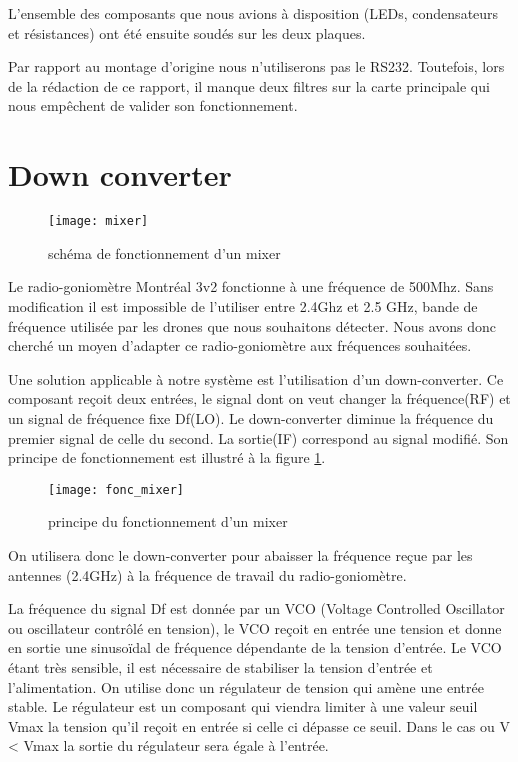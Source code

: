L'ensemble des composants que nous avions à disposition (LEDs, condensateurs et résistances) ont été ensuite soudés sur les deux plaques. 

Par rapport au montage d'origine nous n'utiliserons pas le RS232. Toutefois, lors de la rédaction de ce rapport, il manque deux filtres sur la carte principale qui nous empêchent de valider son fonctionnement.


\section{Down converter}


\begin{wrapfigure}{r}{0.4\textwidth}
  
  \texttt{[image: mixer]}
  \caption{schéma de fonctionnement d'un mixer}
\end{wrapfigure}


Le radio-goniomètre Montréal 3v2 fonctionne à une fréquence de 500Mhz. Sans modification il est impossible de l’utiliser entre 2.4Ghz et 2.5 GHz, bande de fréquence utilisée par les drones que nous souhaitons détecter. Nous avons donc cherché un moyen d’adapter ce radio-goniomètre aux fréquences souhaitées.

Une solution applicable à notre système est l'utilisation d'un down-converter. Ce composant reçoit deux entrées, le signal dont on veut changer la fréquence(RF) et un signal de fréquence fixe Df(LO). Le down-converter diminue la fréquence du premier signal de celle du second. La sortie(IF) correspond au signal modifié. Son principe de fonctionnement est illustré à la figure \ref{fig:mix}.



\begin{figure}[h]
  \centering
  \texttt{[image: fonc\_mixer]}
  \caption{principe du fonctionnement d'un mixer}
  \label{fig:mix}
\end{figure}

On utilisera donc le down-converter pour abaisser la fréquence reçue par les antennes (2.4GHz) à la fréquence de travail du radio-goniomètre.

La fréquence du signal Df est donnée par un VCO (Voltage Controlled Oscillator ou oscillateur contrôlé en tension), le VCO reçoit en entrée une tension et donne en sortie une sinusoïdal de fréquence dépendante de la tension d’entrée. Le VCO étant très sensible, il est nécessaire de stabiliser la tension d’entrée et l’alimentation. On utilise donc un régulateur de tension qui amène une entrée stable. Le régulateur est un composant qui viendra limiter à une valeur seuil Vmax la tension qu'il reçoit en entrée si celle ci dépasse ce seuil. Dans le cas ou V < Vmax la sortie du régulateur sera égale à l'entrée.

